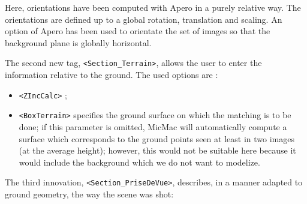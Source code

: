 Here, orientations have been computed with Apero in a purely relative way. The orientations
are defined up to a global rotation, translation and scaling. An option of Apero has been
used to orientate the set of images so that the background plane is globally horizontal.

The second new tag, {\tt <Section\_Terrain>}, allows the user to enter the
information relative to the ground. The used options are :

\begin{itemize}
   \item  {\tt <ZIncCalc>} ;

   \item  {\tt <BoxTerrain>}  specifies the ground surface on which the matching is to be done;
          if  this  parameter is omitted, MicMac will automatically compute a surface which corresponds
          to the ground points seen at least in
          two images (at the average height); however, this would not be suitable
          here because it would include the background which we do not want to modelize.

\end{itemize}


The third innovation, {\tt <Section\_PriseDeVue>}, describes, in a manner adapted to ground geometry,
the way the scene was shot:


